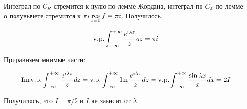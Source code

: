 \begin{example}
    Интеграл по $C_R$ стремится к нулю по лемме Жордана,
    интеграл по $C_\varepsilon$ по лемме о полувычете стремится к
    $\pi i \operatorname*{res}\limits_{z=0} f = \pi i$. Получилось:

    \[
        \mathrm{v. p. }\int_{-\infty}^{+\infty}
        \frac{e^{i\lambda z}}{z}dz = \pi i
    \]

    Приравняем мнимые части:

    \[
        \operatorname{Im} \mathrm{v. p. }\int_{-\infty}^{+\infty}
        \frac{e^{i\lambda z}}{z}dz
        = \mathrm{v. p. }\int_{-\infty}^{+\infty} \operatorname{Im}
        \frac{e^{i\lambda z}}{z}dz
        = \mathrm{v. p. }\int_{-\infty}^{+\infty}
        \frac{\sin \lambda x}{x}dx
        = 2I
    \]

    Получилось, что $I = \pi / 2$ и $I$ не зависит от $\lambda$.
\end{example}
\newpage
